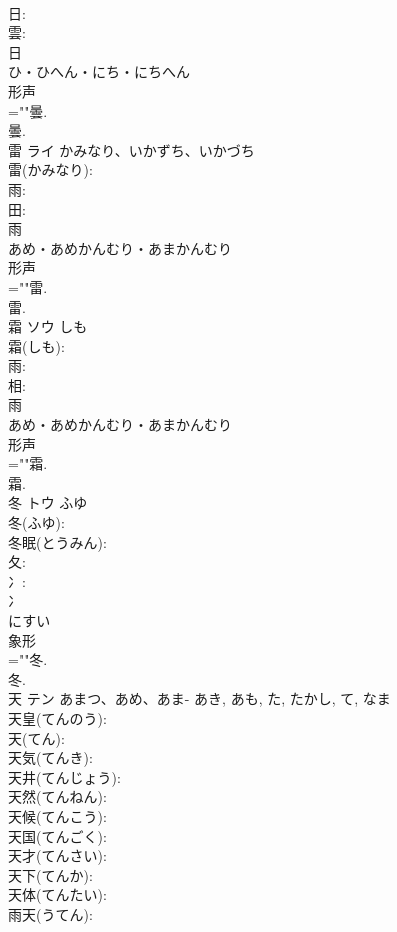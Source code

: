 \documentclass[8pt]{extreport}
\begin{document}
\begin{CJK}{UTF8}{min}
\\	日: 
\\	雲: 
\\	日	
\\	ひ・ひへん・にち・にちへん	
\\	形声 
\\	=""曇.
\\	曇.
\\	雷	ライ	かみなり、いかずち、いかづち		
\\	雷(かみなり): 
\\	雨: 
\\	田: 
\\	雨	
\\	あめ・あめかんむり・あまかんむり	
\\	形声 
\\	=""雷.
\\	雷.
\\	霜	ソウ	しも		
\\	霜(しも): 
\\	雨: 
\\	相: 
\\	雨	
\\	あめ・あめかんむり・あまかんむり	
\\	形声 
\\	=""霜.
\\	霜.
\\	冬	トウ	ふゆ		
\\	冬(ふゆ): 
\\	冬眠(とうみん): 
\\	夂: 
\\	冫: 
\\	冫	
\\	にすい	
\\	象形 
\\	=""冬.
\\	冬.
\\	天	テン	あまつ、あめ、あま-	あき, あも, た, たかし, て, なま	
\\	天皇(てんのう): 
\\	天(てん): 
\\	天気(てんき): 
\\	天井(てんじょう): 
\\	天然(てんねん): 
\\	天候(てんこう): 
\\	天国(てんごく): 
\\	天才(てんさい): 
\\	天下(てんか): 
\\	天体(てんたい): 
\\	雨天(うてん): 

\end{CJK}
\end{document}
